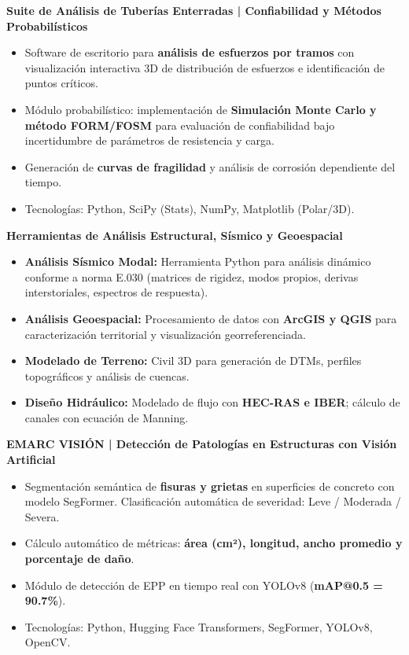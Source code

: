 \documentclass[10pt, a4paper]{article}
\begin{document}
\vspace{1mm}

\textbf{Suite de Análisis de Tuberías Enterradas | Confiabilidad y Métodos Probabilísticos}
\begin{itemize}
    \item Software de escritorio para \textbf{análisis de esfuerzos por tramos} con visualización interactiva 3D de distribución de esfuerzos e identificación de puntos críticos.
    \item Módulo probabilístico: implementación de \textbf{Simulación Monte Carlo y método FORM/FOSM} para evaluación de confiabilidad bajo incertidumbre de parámetros de resistencia y carga.
    \item Generación de \textbf{curvas de fragilidad} y análisis de corrosión dependiente del tiempo.
    \item Tecnologías: Python, SciPy (Stats), NumPy, Matplotlib (Polar/3D).
\end{itemize}

\vspace{1mm}

\textbf{Herramientas de Análisis Estructural, Sísmico y Geoespacial}
\begin{itemize}
    \item \textbf{Análisis Sísmico Modal:} Herramienta Python para análisis dinámico conforme a norma E.030 (matrices de rigidez, modos propios, derivas interstoriales, espectros de respuesta).
    \item \textbf{Análisis Geoespacial:} Procesamiento de datos con \textbf{ArcGIS y QGIS} para caracterización territorial y visualización georreferenciada.
    \item \textbf{Modelado de Terreno:} Civil 3D para generación de DTMs, perfiles topográficos y análisis de cuencas.
    \item \textbf{Diseño Hidráulico:} Modelado de flujo con \textbf{HEC-RAS e IBER}; cálculo de canales con ecuación de Manning.
\end{itemize}

\vspace{1mm}

\textbf{EMARC VISIÓN | Detección de Patologías en Estructuras con Visión Artificial}
\begin{itemize}
    \item Segmentación semántica de \textbf{fisuras y grietas} en superficies de concreto con modelo SegFormer. Clasificación automática de severidad: Leve / Moderada / Severa.
    \item Cálculo automático de métricas: \textbf{área (cm²), longitud, ancho promedio y porcentaje de daño}.
    \item Módulo de detección de EPP en tiempo real con YOLOv8 (\textbf{mAP@0.5 = 90.7\%}).
    \item Tecnologías: Python, Hugging Face Transformers, SegFormer, YOLOv8, OpenCV.
\end{itemize}
\end{document}
